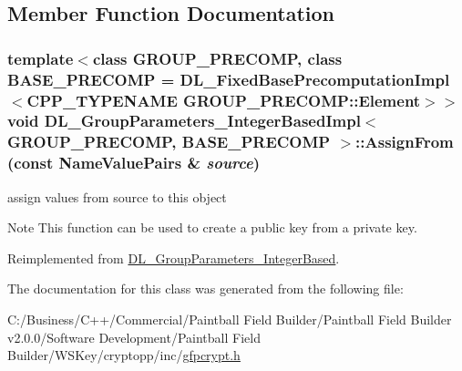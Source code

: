 \subsection{Member Function Documentation}
\hypertarget{class_d_l___group_parameters___integer_based_impl_a0d668d2148cf57078a93f3a5a4b4ac2a}{
\subsubsection[{AssignFrom}]{\setlength{\rightskip}{0pt plus 5cm}template$<$class GROUP\_\-PRECOMP, class BASE\_\-PRECOMP = DL\_\-FixedBasePrecomputationImpl$<$CPP\_\-TYPENAME GROUP\_\-PRECOMP::Element$>$$>$ void {\bf DL\_\-GroupParameters\_\-IntegerBasedImpl}$<$ GROUP\_\-PRECOMP, BASE\_\-PRECOMP $>$::AssignFrom (const {\bf NameValuePairs} \& {\em source})}}
\label{class_d_l___group_parameters___integer_based_impl_a0d668d2148cf57078a93f3a5a4b4ac2a}


assign values from source to this object \begin{DoxyNote}{Note}
This function can be used to create a public key from a private key. 
\end{DoxyNote}


Reimplemented from \hyperlink{class_d_l___group_parameters___integer_based_a151a76c88372bdf98c68be2ad19400e1}{DL\_\-GroupParameters\_\-IntegerBased}.

The documentation for this class was generated from the following file:\begin{DoxyCompactItemize}
\item 
C:/Business/C++/Commercial/Paintball Field Builder/Paintball Field Builder v2.0.0/Software Development/Paintball Field Builder/WSKey/cryptopp/inc/\hyperlink{gfpcrypt_8h}{gfpcrypt.h}\end{DoxyCompactItemize}

